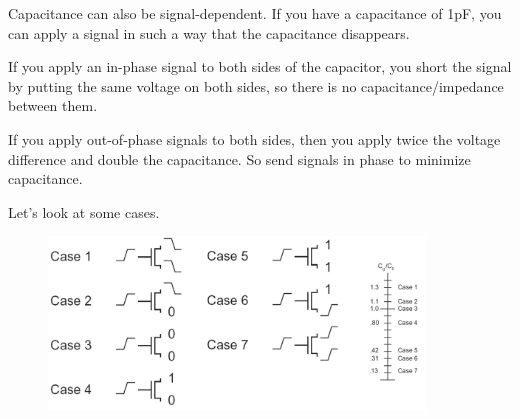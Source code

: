 \documentclass{article}
\begin{document}
Capacitance can also be signal-dependent. If you have a capacitance of 1pF, you can apply a signal in such a way that the capacitance disappears. 

If you apply an in-phase signal to both sides of the capacitor, you short the signal by putting the same voltage on both sides, so there is no capacitance/impedance between them.

If you apply out-of-phase signals to both sides, then you apply twice the voltage difference and double the capacitance. So send signals in phase to minimize capacitance.

Let's look at some cases.

\newpage

\begin{figure}[ht!]
\centering
\includegraphics[width=100mm]{Signals.png}
\end{figure}
\end{document}
